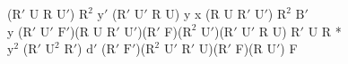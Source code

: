 ($\text{R}'$ U R $\text{U}'$) $\text{R}^2$ $\text{y}'$ ($\text{R}'$ $\text{U}'$ R U) y x (R U $\text{R}'$ $\text{U}'$) $\text{R}^2$ $\text{B}'$\\
y ($\text{R}'$ $\text{U}'$ $\text{F}'$)(R U $\text{R}'$ $\text{U}'$)($\text{R}'$ F)($\text{R}^2$ $\text{U}'$)($\text{R}'$ $\text{U}'$ R U) $\text{R}'$ U R *\\
$\text{y}^2$ ($\text{R}'$ $\text{U}^2$ $\text{R}'$) $\text{d}'$ ($\text{R}'$ $\text{F}'$)($\text{R}^2$ $\text{U}'$ $\text{R}'$ U)($\text{R}'$ F)(R $\text{U}'$) F\\
